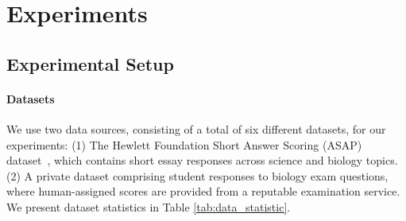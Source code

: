 \section{Experiments} \label{sec:experiments}

\subsection{Experimental Setup}
\paragraph{Datasets} We use two data sources, consisting of a total of six different datasets, for our experiments: (1) The Hewlett Foundation Short Answer Scoring (ASAP) dataset~\cite{asap-aes}, which contains short essay responses across science and biology topics. (2) A private dataset comprising student responses to biology exam questions, where human-assigned scores are provided from a reputable examination service. We present dataset statistics in Table \ref{tab:data_statistic}.



